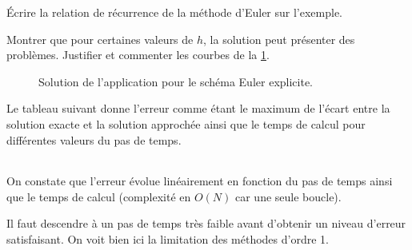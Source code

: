 \documentclass[10pt]{article}
\begin{document}
  {\'Ecrire la relation de récurrence de la méthode d'Euler sur l'exemple.}


  {Montrer que pour certaines valeurs de $h$, la solution peut présenter des problèmes. Justifier et commenter les courbes de la \ref{euler_expl}.}

\begin{figure}[!ht]
\centering

\caption{Solution de l'application pour le schéma Euler explicite.}
\label{euler_expl}
\end{figure}

Le tableau suivant donne l'erreur comme étant le maximum de l'écart entre la solution exacte et la solution approchée ainsi que le temps de calcul pour différentes valeurs du pas de temps.

\begin{center}
\begin{tabular}{*7{|c}|}
\hline
\end{tabular}
\end{center}

On constate que l'erreur évolue linéairement en fonction du pas de temps ainsi que le temps de calcul (complexité en $O(N)$ car une seule boucle).

Il faut descendre à un pas de temps très faible avant d'obtenir un niveau d'erreur satisfaisant. On voit bien ici la limitation des méthodes d'ordre 1.


\end{document}
